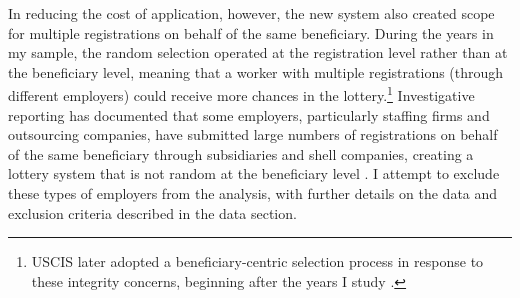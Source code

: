 

In reducing the cost of application, however, the new system also created scope for multiple registrations on behalf of the same beneficiary. During the years in my sample, the random selection operated at the registration level rather than at the beneficiary level, meaning that a worker with multiple registrations (through different employers) could receive more chances in the lottery.\footnote{USCIS later adopted a beneficiary-centric selection process in response to these integrity concerns, beginning after the years I study \citep{uscis_integrity_2024, uscis_beneficiary_centric_2025}.} 
Investigative reporting has documented that some employers, particularly staffing firms and outsourcing companies, have submitted large numbers of registrations on behalf of the same beneficiary through subsidiaries and shell companies, creating a lottery system that is not random at the beneficiary level \citep{Mider2024H1B}. 
I attempt to exclude these types of employers from the analysis, with further details on the data and exclusion criteria described in the data section.



